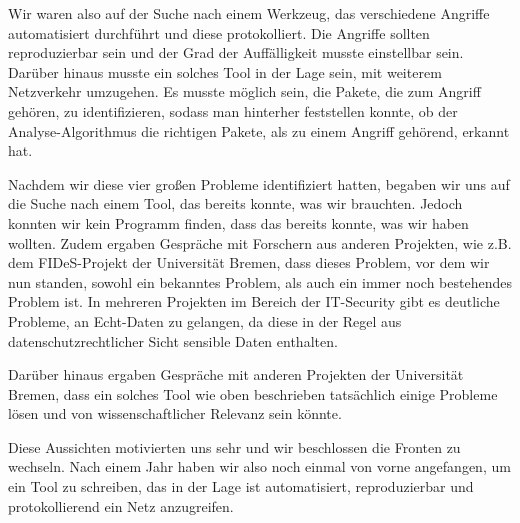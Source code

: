 Wir waren also auf der Suche nach einem Werkzeug, das verschiedene
Angriffe automatisiert durchführt und diese protokolliert. Die
Angriffe sollten reproduzierbar sein und der Grad der Auffälligkeit
musste einstellbar sein. Darüber hinaus musste ein solches Tool in der
Lage sein, mit weiterem Netzverkehr umzugehen. Es musste möglich sein,
die Pakete, die zum Angriff gehören, zu identifizieren, sodass man
hinterher feststellen konnte, ob der Analyse-Algorithmus die richtigen
Pakete, als zu einem Angriff gehörend, erkannt hat.

Nachdem wir diese vier großen Probleme identifiziert hatten, begaben
wir uns auf die Suche nach einem Tool, das bereits konnte, was wir
brauchten. Jedoch konnten wir kein Programm finden, dass das bereits
konnte, was wir haben wollten. Zudem ergaben Gespräche mit Forschern
aus anderen Projekten, wie z.B. dem FIDeS-Projekt der Universität
Bremen, dass dieses Problem, vor dem wir nun standen, sowohl ein
bekanntes Problem, als auch ein immer noch bestehendes Problem ist. In
mehreren Projekten im Bereich der IT-Security gibt es deutliche
Probleme, an Echt-Daten zu gelangen, da diese in der Regel aus
datenschutzrechtlicher Sicht sensible Daten enthalten.

Darüber hinaus ergaben Gespräche mit anderen Projekten der Universität
Bremen, dass ein solches Tool wie oben beschrieben tatsächlich einige
Probleme lösen und von wissenschaftlicher Relevanz sein könnte.

Diese Aussichten motivierten uns sehr und wir beschlossen die Fronten
zu wechseln. Nach einem Jahr haben wir also noch einmal von vorne
angefangen, um ein Tool zu schreiben, das in der Lage ist
automatisiert, reproduzierbar und protokollierend ein Netz
anzugreifen.
